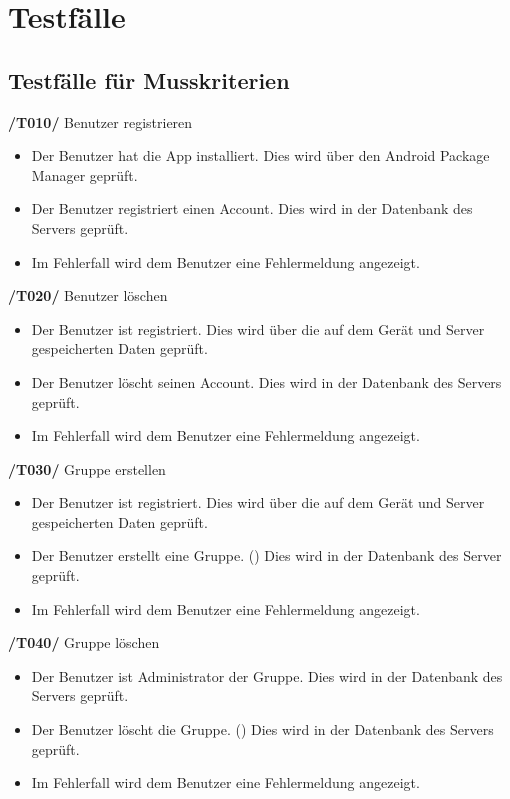 \section{Testfälle}
\subsection{Testfälle für Musskriterien}
\textbf{/T010/} Benutzer registrieren \\
\begin{itemize}
\setlength{\itemsep}{0pt}
\item Der Benutzer hat die App installiert. Dies wird über den Android Package Manager geprüft.
\item Der Benutzer registriert einen Account. Dies wird in der Datenbank des Servers geprüft.
\item Im Fehlerfall wird dem Benutzer eine Fehlermeldung angezeigt.
\end{itemize}


\textbf{/T020/} Benutzer löschen \\
\begin{itemize}
\setlength{\itemsep}{0pt}
\item Der Benutzer ist registriert. Dies wird über die auf dem Gerät
und Server gespeicherten Daten geprüft.
\item Der Benutzer löscht seinen Account. Dies wird in der Datenbank des Servers geprüft.
\item Im Fehlerfall wird dem Benutzer eine Fehlermeldung angezeigt.
\end{itemize}


\textbf{/T030/} Gruppe erstellen \\
\begin{itemize}
\setlength{\itemsep}{0pt}
\item Der Benutzer ist registriert. Dies wird über die auf dem Gerät
und Server gespeicherten Daten geprüft.
\item Der Benutzer erstellt eine Gruppe. () Dies wird in der Datenbank des Server geprüft.
\item Im Fehlerfall wird dem Benutzer eine Fehlermeldung angezeigt.
\end{itemize}

\textbf{/T040/} Gruppe löschen \\
\begin{itemize}
\setlength{\itemsep}{0pt}
\item Der Benutzer ist Administrator der Gruppe. Dies wird in der Datenbank des Servers geprüft.
\item Der Benutzer löscht die Gruppe. () Dies wird in der Datenbank des Servers geprüft.
\item Im Fehlerfall wird dem Benutzer eine Fehlermeldung angezeigt.
\end{itemize}

